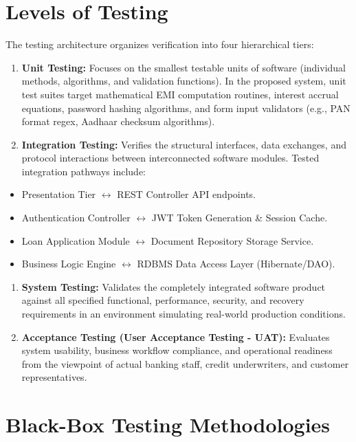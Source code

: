 \documentclass[12pt,a4paper,oneside]{report}
\begin{document}
\section{Levels of Testing}

The testing architecture organizes verification into four hierarchical tiers:

\begin{enumerate}
  \item \textbf{Unit Testing:} Focuses on the smallest testable units of software (individual methods, algorithms, and validation functions). In the proposed system, unit test suites target mathematical EMI computation routines, interest accrual equations, password hashing algorithms, and form input validators (e.g., PAN format regex, Aadhaar checksum algorithms).
  \item \textbf{Integration Testing:} Verifies the structural interfaces, data exchanges, and protocol interactions between interconnected software modules. Tested integration pathways include:
\end{enumerate}

\begin{itemize}
  \item Presentation Tier $\leftrightarrow$ REST Controller API endpoints.
  \item Authentication Controller $\leftrightarrow$ JWT Token Generation \& Session Cache.
  \item Loan Application Module $\leftrightarrow$ Document Repository Storage Service.
  \item Business Logic Engine $\leftrightarrow$ RDBMS Data Access Layer (Hibernate/DAO).
\end{itemize}

\begin{enumerate}
  \item \textbf{System Testing:} Validates the completely integrated software product against all specified functional, performance, security, and recovery requirements in an environment simulating real-world production conditions.
  \item \textbf{Acceptance Testing (User Acceptance Testing - UAT):} Evaluates system usability, business workflow compliance, and operational readiness from the viewpoint of actual banking staff, credit underwriters, and customer representatives.
\end{enumerate}

\section{Black-Box Testing Methodologies}
\end{document}
